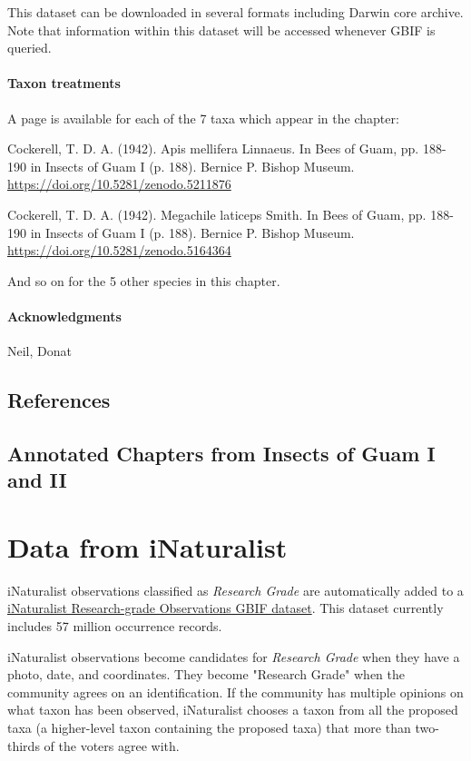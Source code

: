 \documentclass[12pt,letterpaper,english,bibliography=totocnumbered, abstract=on]{scrartcl}
\begin{document}
This dataset can be downloaded in several formats including Darwin core archive. Note that information within this dataset will be accessed whenever GBIF is queried.

\paragraph{Taxon treatments} A page is available for each of the 7 taxa which appear in the chapter:

\medskip
Cockerell, T. D. A. (1942). Apis mellifera Linnaeus. In Bees of Guam, pp. 188-190 in Insects of Guam I (p. 188). Bernice P. Bishop Museum. \url{https://doi.org/10.5281/zenodo.5211876}

\medskip
Cockerell, T. D. A. (1942). Megachile laticeps Smith. In Bees of Guam, pp. 188-190 in Insects of Guam I (p. 188). Bernice P. Bishop Museum. \url{https://doi.org/10.5281/zenodo.5164364}

\medskip
And so on for the 5 other species in this chapter.

\paragraph{Acknowledgments} Neil, Donat

\subsection{References}
\printbibliography[heading=none]


\subsection{Annotated Chapters from Insects of Guam I and II}
\newrefsection[blr]
\nocite{*}
\printbibliography[heading=none]



\pagebreak
\section{Data from iNaturalist}

iNaturalist observations classified as \textit{Research Grade} are automatically added to a \href{https://www.gbif.org/dataset/50c9509d-22c7-4a22-a47d-8c48425ef4a7}{iNaturalist Research-grade Observations GBIF dataset}. This dataset currently includes 57 million occurrence records. 

iNaturalist observations become candidates for \textit{Research Grade} when they have a photo, date, and coordinates. They become "Research Grade" when the community agrees on an identification. If the community has multiple opinions on what taxon has been observed, iNaturalist chooses a taxon from all the proposed taxa (a higher-level taxon containing the proposed taxa) that more than two-thirds of the voters agree with.
\end{document}
